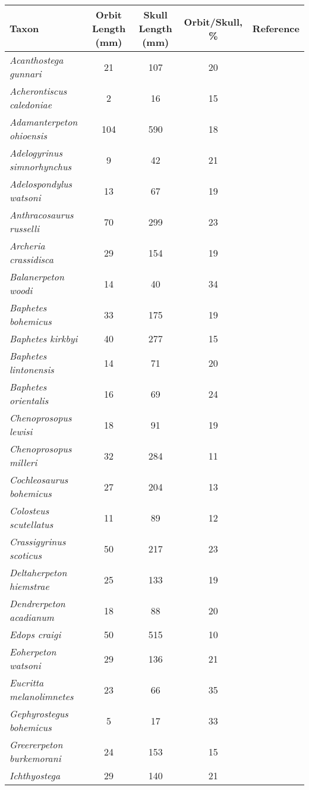 \begin{tabular}{|L{4.5cm}|c|c|c|L{4.5cm}|}
\hline
\textbf{Taxon}&\textbf{Orbit Length (mm)}&\textbf{Skull Length (mm)}&\textbf{Orbit/Skull, \%}&\textbf{Reference}\\\hline
\textit{Acanthostega gunnari}&21&107&20&\\\hline
\textit{Acherontiscus caledoniae}&2&16&15&\\\hline
\textit{Adamanterpeton ohioensis}&104&590&18&\\\hline
\textit{Adelogyrinus simnorhynchus}&9&42&21&\cite{Lomb95a}\\\hline
\textit{Adelospondylus watsoni}&13&67&19&\\\hline
\textit{Anthracosaurus russelli}&70&299&23&\\\hline
\textit{Archeria crassidisca}&29&154&19&\cite{Panc85a}\\\hline
\textit{Balanerpeton woodi}&14&40&34&\cite{Bolt10a}\\\hline
\textit{Baphetes bohemicus}&33&175&19&\\\hline
\textit{Baphetes kirkbyi}&40&277&15&\\\hline
\textit{Baphetes lintonensis}&14&71&20&\\\hline
\textit{Baphetes orientalis}&16&69&24&\\\hline
\textit{Chenoprosopus lewisi}&18&91&19&\cite{Beau77a}\\\hline
\textit{Chenoprosopus milleri}&32&284&11&\cite{Clac98a}\\\hline
\textit{Cochleosaurus bohemicus}&27&204&13&\cite{Warr04a,Warr07a}\\\hline
\textit{Colosteus scutellatus}&11&89&12&\\\hline
\textit{Crassigyrinus scoticus}&50&217&23&\\\hline
\textit{Deltaherpeton hiemstrae}&25&133&19&\\\hline
\textit{Dendrerpeton acadianum}&18&88&20&\cite{Beau98a}\\\hline
\textit{Edops craigi}&50&515&10&\cite{Bent90a}\\\hline
\textit{Eoherpeton watsoni}&29&136&21&\cite{Ahlb08a}\\\hline
\textit{Eucritta melanolimnetes}&23&66&35&\\\hline
\textit{Gephyrostegus bohemicus}&5&17&33&\\\hline
\textit{Greererpeton burkemorani}&24&153&15&\\\hline
\textit{Ichthyostega}&29&140&21&\\\hline

\end{tabular}
